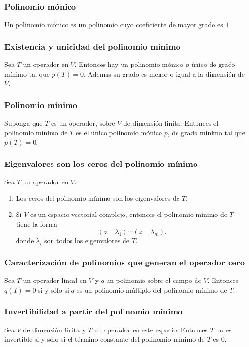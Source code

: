 \documentclass{article}
\begin{document}
\subsubsection{Polinomio mónico}
Un polinomio mónico es un polinomio cuyo coeficiente de
mayor grado es $1$.

\subsubsection{Existencia y unicidad del polinomio mínimo}
Sea $T$ un operador en $V$. Entonces hay un polinomio mónico
$p$ único de grado mínimo tal que $p(T)=0$. Además
su grado es menor o igual a la dimensión de $V$.

\subsubsection{Polinomio mínimo}
Suponga que $T$ es un operador, sobre $V$ de dimensión finita.
Entonces el polinomio mínimo de $T$ es el único
polinomio mónico $p$, de grado mínimo tal que 
$p(T)=0$.

\subsubsection{Eigenvalores son los ceros del polinomio mínimo}
Sea $T$ un operador en $V$.
\begin{enumerate}
    \item Los ceros del polinomio mínimo son los eigenvalores
    de $T$.
    \item Si $V$ es un espacio vectorial complejo, entonces
    el polinomio mínimo de $T$ tiene la forma
    $$(z-\lambda_1)\cdots(z-\lambda_m),$$
    donde $\lambda_i$ son todos los eigenvalores de $T$.
\end{enumerate}

\subsubsection{Caracterización de polinomios que generan el operador cero}
Sea $T$ un operador lineal en $V$ y $q$ un polinomio sobre el
campo de $V$. Entonces $q(T)=0$ si y sólo si $q$
es un polinomio múltiplo del polinomio mínimo de $T$.

\subsubsection{Invertibilidad a partir del polinomio mínimo}
Sea $V$ de dimensión finita y $T$ un operador en este espacio.
Entonces $T$ no es invertible si y sólo si el término
constante del polinomio mínimo de $T$ es $0$.
\end{document}
